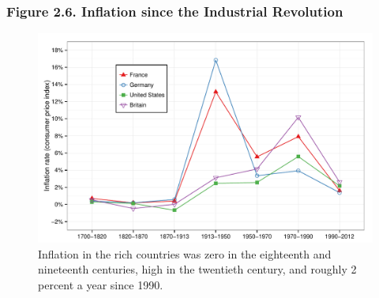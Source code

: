 \documentclass[t]{beamer}\usepackage[]{graphicx}\usepackage[]{color}
\newenvironment{knitrout}{}{} %
\begin{document}
\begin{frame}[label=Figure_2_6,fragile]
\frametitle{Figure 2.6. Inflation since the Industrial Revolution}
\begin{figure}[t]
\begin{minipage}[b]{\textwidth}
\centering
\begin{knitrout}\footnotesize
{}\color{fgcolor}

{\centering \includegraphics[width=1\linewidth]{figures/color/Figure_2_6} 

}



\end{knitrout}
\caption{Inflation in the rich countries was zero in the eighteenth and nineteenth centuries, high in the twentieth century, and roughly 2 percent a year since 1990.}
\end{minipage}
\end{figure}
\end{frame}
\end{document}
